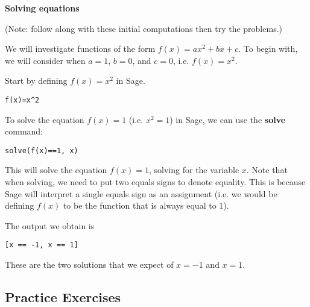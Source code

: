 {\bf \Large Solving equations}

(Note: follow along with these initial computations then try the problems.)

We will investigate functions of the form $f(x)=ax^2+bx+c$. To begin
with, we will consider when $a=1$, $b=0$, and $c=0$, i.e. $f(x)=x^2$.


Start by defining $f(x)=x^2$ in Sage.

\begin{verbatim}
f(x)=x^2
\end{verbatim}

To solve the equation $f(x)=1$ (i.e. $x^2=1$) in Sage, we can use the
\textbf{solve} command:

\begin{verbatim}
solve(f(x)==1, x)
\end{verbatim}

This will solve the equation $f(x)=1$, solving for the variable $x$.
Note that when solving, we need to put two equals signs to denote
equality. This is because Sage will interpret a single equals sign
as an assignment (i.e. we would be defining $f(x)$ to be the function
that is always equal to $1$).

The output we obtain is

\begin{verbatim}
[x == -1, x == 1]
\end{verbatim}

These are the two solutions that we expect of $x=-1$ and $x=1$.

\subsection{Practice Exercises}

